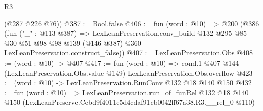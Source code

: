 \begin{lexlean}{R3}
\begin{coremodule}
      (@287 @226 @76))
@387 := Bool.false
@406 := fun (word : @10) =>
  @200
    (@386
      (fun ("_" : @113 @387) =>
      LexLeanPreservation.conv_build
        @132
        @295
        @85
        @30
        @51
        @98
        @98
        @139
        (@146 @387)
        @360
        LexLeanPreservation.construct_false))
@407 := LexLeanPreservation.Obs
@408 := (word : @10) -> @407
@417 := fun (word : @10) =>
  cond.{1} @407 @144 (LexLeanPreservation.Obs.value @149) LexLeanPreservation.Obs.overflow
@423 := (word : @10) -> LexLeanPreservation.RunConv @132 @18 @140 @150
@432 := fun (word : @10) =>
  LexLeanPreservation.run_of_funRel
    @132
    @18
    @140
    @150
    (LexLeanPreserve.Cebd9f4011e5d4cdaf91cb0042ff67a38.R3.__rel_0 @110)
\end{coremodule}
\end{lexlean}

